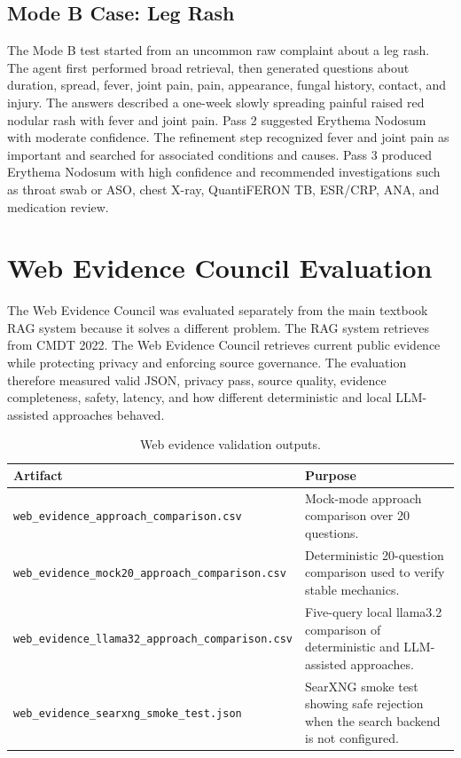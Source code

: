 \subsection{Mode B Case: Leg Rash}

The Mode B test started from an uncommon raw complaint about a leg rash. The agent first performed broad retrieval, then generated questions about duration, spread, fever, joint pain, pain, appearance, fungal history, contact, and injury. The answers described a one-week slowly spreading painful raised red nodular rash with fever and joint pain. Pass 2 suggested Erythema Nodosum with moderate confidence. The refinement step recognized fever and joint pain as important and searched for associated conditions and causes. Pass 3 produced Erythema Nodosum with high confidence and recommended investigations such as throat swab or ASO, chest X-ray, QuantiFERON TB, ESR/CRP, ANA, and medication review.

\section{Web Evidence Council Evaluation}

The Web Evidence Council was evaluated separately from the main textbook RAG system because it solves a different problem. The RAG system retrieves from CMDT 2022. The Web Evidence Council retrieves current public evidence while protecting privacy and enforcing source governance. The evaluation therefore measured valid JSON, privacy pass, source quality, evidence completeness, safety, latency, and how different deterministic and local LLM-assisted approaches behaved.

\begin{table}[htbp]
\centering
\caption{Web evidence validation outputs.}
\label{tab:web_evidence_outputs}
\begin{tabular}{p{} p{}}
\toprule
\textbf{Artifact} & \textbf{Purpose}\\
\midrule
\texttt{web\_evidence\_approach\_comparison.csv} & Mock-mode approach comparison over 20 questions.\\
\texttt{web\_evidence\_mock20\_approach\_comparison.csv} & Deterministic 20-question comparison used to verify stable mechanics.\\
\texttt{web\_evidence\_llama32\_approach\_comparison.csv} & Five-query local llama3.2 comparison of deterministic and LLM-assisted approaches.\\
\texttt{web\_evidence\_searxng\_smoke\_test.json} & SearXNG smoke test showing safe rejection when the search backend is not configured.\\
\bottomrule
\end{tabular}
\end{table}

